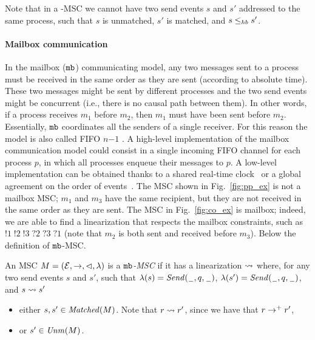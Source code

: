 Note that in a \co-MSC we cannot have two send events $s$ and $s'$ addressed to the same process, such that $s$ is unmatched, $s'$ is matched, and $s \leq_{hb} s'$. 

\paragraph{\bf Mailbox communication}
In the mailbox ($\mathtt{mb}$) communicating model, any two messages sent to a process  must be received in the same order as they are sent (according to absolute time). These two messages might be sent by different processes and the two send events might be concurrent (i.e., there is no causal path between them). In other words, if a process  receives $m_1$ before $m_2$, then $m_1$ must have been sent before $m_2$. Essentially, $\mathtt{mb}$ coordinates all the senders of a single receiver. For this reason the model is also called FIFO $n\mathsf{-}1$ \cite{DBLP:journals/fac/ChevrouHQ16}.   A high-level implementation of the mailbox communication model could consist in a single incoming FIFO channel for each process $p$, in which all processes enqueue their messages to $p$. 
A low-level implementation can be obtained thanks to a shared real-time clock~\cite{cristian1999timed} or a global agreement on the order of events~\cite{defago2004total, raynal2010communication}.
The MSC shown in Fig.~\ref{fig:pp_ex} is not a mailbox MSC; $m_1$ and $m_3$ have the same recipient, but they are not received in the same order as they are sent. The MSC in Fig.~\ref{fig:co_ex} is mailbox; indeed, we are able to find a linearization that respects the mailbox constraints, such as $!1\;!2\;!3\;?2\;?3\;?1$ (note that $m_2$ is both sent and received before $m_3$). Below the definition of $\mathtt{mb}$-MSC.

\begin{definition}\label{def:mb_msc}
	An MSC $M = (\mathcal{E},\to,\lhd,\lambda)$ is a \emph{$\mathtt{mb}$-MSC} if it has a linearization $\rightsquigarrow$ where, for any two send events $s$ and $s'$, such that $\lambda(s)={\mathit{Send}(\hspace{0.1em}\underline{\hspace{0.5em}}\hspace{0.1em},q,\hspace{0.1em}\underline{\hspace{0.5em}}\hspace{0.1em})}$, $\lambda(s')={\mathit{Send}(\hspace{0.1em}\underline{\hspace{0.5em}}\hspace{0.1em},q,\hspace{0.1em}\underline{\hspace{0.5em}}\hspace{0.1em})}$, and $s \rightsquigarrow s'$
	\begin{itemize}%
		\item either $s,s' \in \mathit{Matched}(M)$. Note that $r \rightsquigarrow r'$, since we have that $r \to^+ r'$,
		\item or $s' \in \mathit{Unm}(M)$.
	\end{itemize}
\end{definition}

